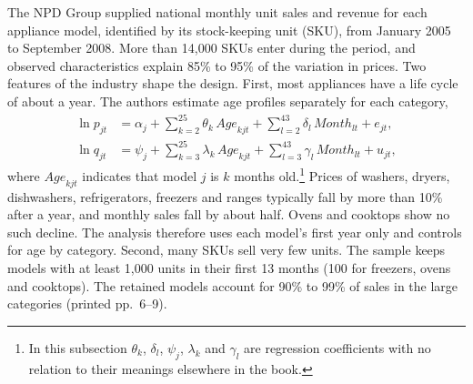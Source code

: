  The NPD Group supplied national monthly unit sales and revenue for each appliance model, identified
by its stock-keeping unit (SKU), from January 2005 to September 2008. More than 14,000 SKUs enter during the
period, and observed characteristics explain 85\% to 95\% of the variation in prices. Two features of the industry
shape the design. First, most appliances have a life cycle of about a year. The authors estimate age profiles
separately for each category,
\begin{align}
\ln p_{jt}&=\alpha_j+\sum_{k=2}^{25}\theta_k\,\mathit{Age}_{kjt}+\sum_{l=2}^{43}\delta_l\,\mathit{Month}_{lt}+e_{jt},\label{eq:11-ahw-age}\\
\ln q_{jt}&=\psi_j+\sum_{k=3}^{25}\lambda_k\,\mathit{Age}_{kjt}+\sum_{l=3}^{43}\gamma_l\,\mathit{Month}_{lt}+u_{jt},\nonumber
\end{align}
where $\mathit{Age}_{kjt}$ indicates that model $j$ is $k$ months old.\footnote{In this subsection $\theta_k$,
$\delta_l$, $\psi_j$, $\lambda_k$ and $\gamma_l$ are regression coefficients with no relation to their meanings
elsewhere in the book.} Prices of washers, dryers, dishwashers, refrigerators, freezers and ranges typically fall by more
than 10\% after a year, and monthly sales fall by about half. Ovens and cooktops show no such decline. The analysis
therefore uses each model's first year only and controls for age by category. Second, many SKUs sell very few
units. The sample keeps models with at least 1,000 units in their first 13 months (100 for freezers, ovens and
cooktops). The retained models account for 90\% to 99\% of sales in the large categories (printed pp.~6--9).

